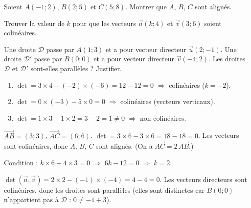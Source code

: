 \documentclass[11pt]{article}
\begin{document}
\begin{exercice}[Exercice 2]
Soient $A(-1;2)$, $B(2;5)$ et $C(5;8)$. Montrer que $A$, $B$, $C$ sont alignés.
\end{exercice}

\begin{exercice}[Exercice 3]
Trouver la valeur de $k$ pour que les vecteurs $\vec{u}(k;4)$ et $\vec{v}(3;6)$ soient colinéaires.
\end{exercice}

\begin{exercice}[Exercice 4]
Une droite $\mathcal{D}$ passe par $A(1;3)$ et a pour vecteur directeur $\vec{u}(2;-1)$. Une droite $\mathcal{D}'$ passe par $B(0;0)$ et a pour vecteur directeur $\vec{v}(-4;2)$. Les droites $\mathcal{D}$ et $\mathcal{D}'$ sont-elles parallèles ? Justifier.
\end{exercice}

\begin{corrige}[Exercice 1]
\begin{enumerate}
\item $\det = 3\times4 - (-2)\times(-6) = 12 - 12 = 0$ $\Rightarrow$ colinéaires ($k=-2$).
\item $\det = 0\times(-3) - 5\times0 = 0$ $\Rightarrow$ colinéaires (vecteurs verticaux).
\item $\det = 1\times3 - 1\times2 = 3 - 2 = 1 \neq 0$ $\Rightarrow$ non colinéaires.
\end{enumerate}
\end{corrige}

\begin{corrige}[Exercice 2]
$\overrightarrow{AB} = (3;3)$, $\overrightarrow{AC} = (6;6)$.  
$\det = 3\times6 - 3\times6 = 18 - 18 = 0$.  
Les vecteurs sont colinéaires, donc $A$, $B$, $C$ sont alignés. (On a $\overrightarrow{AC}=2\,\overrightarrow{AB}$.)
\end{corrige}

\begin{corrige}[Exercice 3]
Condition : $k\times6 - 4\times3 = 0 \;\Rightarrow\; 6k - 12 = 0 \;\Rightarrow\; k = 2$.
\end{corrige}

\begin{corrige}[Exercice 4]
$\det(\vec{u},\vec{v}) = 2\times2 - (-1)\times(-4) = 4 - 4 = 0$.  
Les vecteurs directeurs sont colinéaires, donc les droites sont parallèles (elles sont distinctes car $B(0;0)$ n'appartient pas à $\mathcal{D}$ : $0 \neq -1+3$).
\end{corrige}
\end{document}
